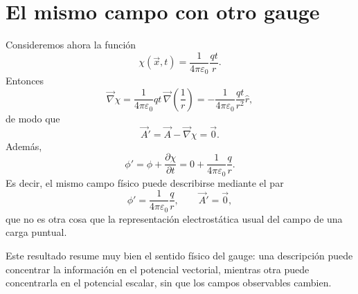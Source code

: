 \documentclass[../main.tex]{subfiles}
\begin{document}
\section*{El mismo campo con otro gauge}
Consideremos ahora la función
\begin{equation*}
    \chi(\vec x,t)=\frac{1}{4\pi\varepsilon_0}\frac{qt}{r}.
\end{equation*}
Entonces
\begin{equation*}
    \vec\nabla \chi = \frac{1}{4\pi\varepsilon_0}qt\,\vec\nabla\left(\frac{1}{r}\right)
    = -\frac{1}{4\pi\varepsilon_0}\frac{qt}{r^2}\hat r,
\end{equation*}
de modo que
\begin{equation*}
    \vec A' = \vec A - \vec\nabla\chi = \vec 0.
\end{equation*}
Además,
\begin{equation*}
    \phi' = \phi + \frac{\partial \chi}{\partial t}
    = 0 + \frac{1}{4\pi\varepsilon_0}\frac{q}{r}.
\end{equation*}
Es decir, el mismo campo físico puede describirse mediante el par
\begin{equation*}
    \phi' = \frac{1}{4\pi\varepsilon_0}\frac{q}{r},
    \qquad
    \vec A' = \vec 0,
\end{equation*}
que no es otra cosa que la representación electrostática usual del campo de una carga puntual.

Este resultado resume muy bien el sentido físico del gauge: una descripción puede concentrar la información en el potencial vectorial, mientras otra puede concentrarla en el potencial escalar, sin que los campos observables cambien.
\end{document}
